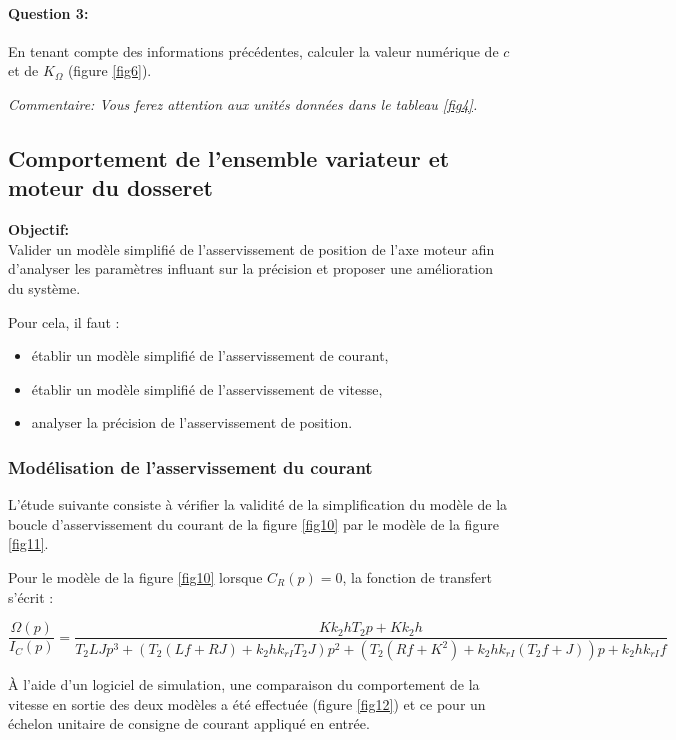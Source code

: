 \paragraph{Question 3:} En tenant compte des informations précédentes, calculer la valeur numérique de $c$ et de $K_{\Omega}$ (figure \ref{fig6}).

\textit{Commentaire: Vous ferez attention aux unités données dans le tableau \ref{fig4}.}

\subsection{Comportement de l'ensemble variateur et moteur du dosseret}

\textbf{Objectif:}\\
Valider un modèle simplifié de l'asservissement de position de l'axe moteur afin d'analyser les paramètres influant sur la précision et proposer une amélioration du système.

Pour cela, il faut :
\begin{itemize}
 \item établir un modèle simplifié de l'asservissement de courant,
 \item établir un modèle simplifié de l'asservissement de vitesse,
 \item analyser la précision de l'asservissement de position.
\end{itemize}

\subsubsection{Modélisation de l'asservissement du courant}

L'étude suivante consiste à vérifier la validité de la simplification du modèle de la boucle d'asservissement du courant de la figure \ref{fig10} par le modèle de la figure \ref{fig11}.

Pour le modèle de la figure \ref{fig10} lorsque $C_R(p)=0$, la fonction de transfert s'écrit :

\begin{center}
$\dfrac{\Omega(p)}{I_C(p)}=\dfrac{Kk_2hT_2p+Kk_2h}{T_2LJp^3+(T_2(Lf+RJ)+k_2hk_{rI}T_2 J)p^2+(T_2(Rf+K^2)+k_2hk_{rI}(T_2f+J))p+k_2hk_{rI}f}$
\end{center}

À l'aide d'un logiciel de simulation, une comparaison du comportement de la vitesse en sortie des deux modèles a été effectuée (figure \ref{fig12}) et ce pour un échelon unitaire de consigne de courant appliqué en entrée.

